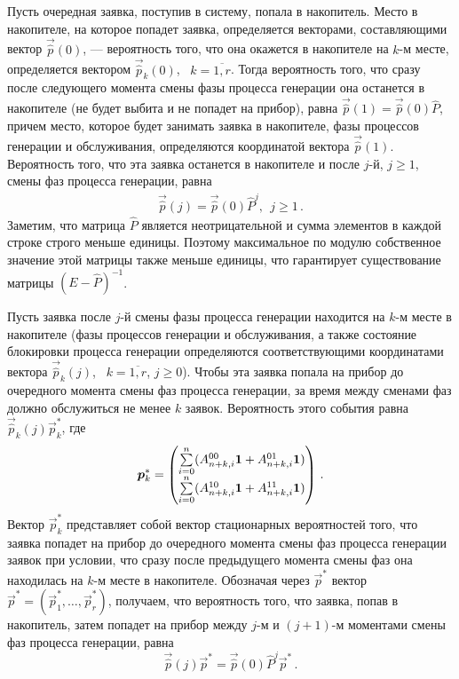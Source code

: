 \begin{multicols}{2}
Пусть очередная заявка, поступив в систему, попала в накопитель.
Место в накопителе, на которое попадет заявка, определяется векторами, составляющими вектор $\vec{\hat p}(0)$, ---
вероятность того, что она окажется в накопителе на $k$-м месте,
определяется вектором $\vec{\hat p}_{k}(0)$, \ $k=\overline{1,r}$.
Тогда вероятность того, что сразу после следующего момента смены фазы процесса генерации
она останется в накопителе (не будет выбита и не попадет на прибор), равна
$\vec{\hat p}(1)=\vec{\hat p}(0)\hat P$,
причем место, которое будет занимать заявка в накопителе, фазы процессов генерации и обслуживания,
определяются координатой вектора $\vec{\hat p}(1)$.
Вероятность того, что эта заявка останется в накопителе и после $j$-й, $j\ge 1$, смены фаз процесса генерации, равна
\begin{gather*}
\vec{\hat p}(j)=\vec{\hat p}(0)\hat P^j, \ \ j\ge 1\,.
\end{gather*}
Заметим, что матрица $\hat P$ является неотрицательной и
сумма элементов в каждой строке строго меньше единицы.
Поэтому максимальное по модулю собственное значение этой матрицы также меньше единицы,
что гарантирует существование матрицы $(E-\hat P)^{-1}$.

Пусть заявка после $j$-й смены фазы процесса генерации находится на $k$-м месте в накопителе
(фазы процессов генерации и обслуживания, а также состояние блокировки процесса генерации
определяются соответствующими координатами вектора $\vec{\hat p}_{k}(j)$, \ $k=\overline{1,r}$, $j\ge0$).
Чтобы эта заявка попала на прибор до очередного момента смены фаз процесса генерации,
за время между сменами фаз должно обслужиться не менее $k$ заявок.
Вероятность этого события равна
$
\vec{\hat p}_{k}(j) \vec{p}_k^*
$, где
$$
\vec{p}_k^*=
\begin{pmatrix}
\sum\limits_{i=0}^{n}(A_{n+k,i}^{00}{\bf 1}+A_{n+k,i}^{01}{\bf 1})\\[6pt]
\sum\limits_{i=0}^{n}(A_{n+k,i}^{10}{\bf 1}+A_{n+k,i}^{11}{\bf 1})
\end{pmatrix}\,.
$$
Вектор $\vec{p}_k^*$ представляет собой вектор стационарных вероятностей того,
что заявка попадет на прибор до очередного момента смены фаз процесса генерации заявок при условии,
что сразу после предыду\-ще\-го момента смены фаз она находилась на $k$-м месте в накопителе.
Обозначая через $\vec{p}^*$ вектор $\vec{p}^*=(\vec{p}_1^*,\ldots,\vec{p}_r^*)$,
получаем, что вероятность того, что заявка, попав в накопитель, затем попадет на прибор
между $j$-м и $(j+1)$-м моментами смены фаз процесса генерации, равна
$$
\vec{\hat p}(j)\vec{p}^*=\vec{\hat p}(0)\hat P^{j}\vec{p}^*\,.
$$


\end{multicols}
